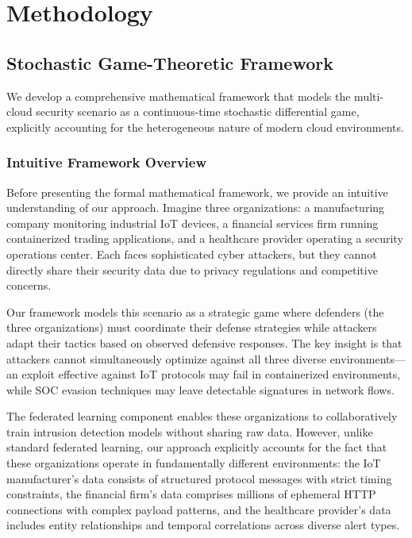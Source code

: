 \documentclass[12pt,a4paper]{article}
\theoremstyle{definition}
\begin{document}
\section{Methodology}

\subsection{Stochastic Game-Theoretic Framework}

We develop a comprehensive mathematical framework that models the multi-cloud security scenario as a continuous-time stochastic differential game, explicitly accounting for the heterogeneous nature of modern cloud environments.

\subsubsection{Intuitive Framework Overview}

Before presenting the formal mathematical framework, we provide an intuitive understanding of our approach. Imagine three organizations: a manufacturing company monitoring industrial IoT devices, a financial services firm running containerized trading applications, and a healthcare provider operating a security operations center. Each faces sophisticated cyber attackers, but they cannot directly share their security data due to privacy regulations and competitive concerns.

Our framework models this scenario as a strategic game where defenders (the three organizations) must coordinate their defense strategies while attackers adapt their tactics based on observed defensive responses. The key insight is that attackers cannot simultaneously optimize against all three diverse environments—an exploit effective against IoT protocols may fail in containerized environments, while SOC evasion techniques may leave detectable signatures in network flows.

The federated learning component enables these organizations to collaboratively train intrusion detection models without sharing raw data. However, unlike standard federated learning, our approach explicitly accounts for the fact that these organizations operate in fundamentally different environments: the IoT manufacturer's data consists of structured protocol messages with strict timing constraints, the financial firm's data comprises millions of ephemeral HTTP connections with complex payload patterns, and the healthcare provider's data includes entity relationships and temporal correlations across diverse alert types.
\end{document}
